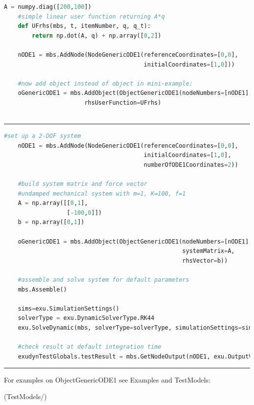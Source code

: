     \userFunctionExample{}
    \pythonstyle
    \begin{lstlisting}[language=Python]
    A = numpy.diag([200,100])
    #simple linear user function returning A*q
    def UFrhs(mbs, t, itemNumber, q, q_t): 
        return np.dot(A, q) + np.array([0,2])
        
    nODE1 = mbs.AddNode(NodeGenericODE1(referenceCoordinates=[0,0],
                                        initialCoordinates=[1,0]))

    #now add object instead of object in mini-example:
    oGenericODE1 = mbs.AddObject(ObjectGenericODE1(nodeNumbers=[nODE1], 
                       rhsUserFunction=UFrhs)
                                 
    \end{lstlisting}
\vspace{6pt}\par\noindent\rule{\textwidth}{0.4pt}
\label{miniExample_ObjectGenericODE1}
\pythonstyle
\begin{lstlisting}[language=Python, firstnumber=1]
    #set up a 2-DOF system
    nODE1 = mbs.AddNode(NodeGenericODE1(referenceCoordinates=[0,0],
                                        initialCoordinates=[1,0],
                                        numberOfODE1Coordinates=2))

    #build system matrix and force vector
    #undamped mechanical system with m=1, K=100, f=1
    A = np.array([[0,1],
                  [-100,0]])
    b = np.array([0,1])
    
    oGenericODE1 = mbs.AddObject(ObjectGenericODE1(nodeNumbers=[nODE1], 
                                                   systemMatrix=A, 
                                                   rhsVector=b))
    
    #assemble and solve system for default parameters
    mbs.Assemble()
    
    sims=exu.SimulationSettings()
    solverType = exu.DynamicSolverType.RK44
    exu.SolveDynamic(mbs, solverType=solverType, simulationSettings=sims)

    #check result at default integration time
    exudynTestGlobals.testResult = mbs.GetNodeOutput(nODE1, exu.OutputVariableType.Coordinates)[0]

\end{lstlisting}

\vspace{6pt}\par\noindent\rule{\textwidth}{0.4pt}
%
\noindent For examples on ObjectGenericODE1 see Examples and TestModels:
\bi
\item {} (TestModels/)
\ei

